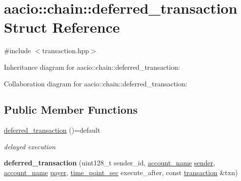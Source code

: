 \hypertarget{structaacio_1_1chain_1_1deferred__transaction}{}\section{aacio\+:\+:chain\+:\+:deferred\+\_\+transaction Struct Reference}
\label{structaacio_1_1chain_1_1deferred__transaction}


{\ttfamily \#include $<$transaction.\+hpp$>$}



Inheritance diagram for aacio\+:\+:chain\+:\+:deferred\+\_\+transaction\+:


Collaboration diagram for aacio\+:\+:chain\+:\+:deferred\+\_\+transaction\+:
\subsection*{Public Member Functions}
\begin{DoxyCompactItemize}
\item 
\mbox{\label{structaacio_1_1chain_1_1deferred__transaction_a7d0c49eab66f03e77d18849a0d96262d}} 
\mbox{\hyperlink{structaacio_1_1chain_1_1deferred__transaction_a7d0c49eab66f03e77d18849a0d96262d}{deferred\+\_\+transaction}} ()=default
\begin{DoxyCompactList}\small\item\em delayed execution \end{DoxyCompactList}\item 
\mbox{\label{structaacio_1_1chain_1_1deferred__transaction_a257fa1d5301fb8acad482281f24724da}} 
{\bfseries deferred\+\_\+transaction} (uint128\+\_\+t sender\+\_\+id, \mbox{\hyperlink{structaacio_1_1chain_1_1name}{account\+\_\+name}} \mbox{\hyperlink{structaacio_1_1chain_1_1deferred__transaction_a9f90d4dc7bf261b8450dd565f15fc82c}{sender}}, \mbox{\hyperlink{structaacio_1_1chain_1_1name}{account\+\_\+name}} \mbox{\hyperlink{structaacio_1_1chain_1_1deferred__transaction_a6c684aa768b05c5645bbef7e054cad8a}{payer}}, \mbox{\hyperlink{classfc_1_1time__point__sec}{time\+\_\+point\+\_\+sec}} execute\+\_\+after, const \mbox{\hyperlink{structaacio_1_1chain_1_1transaction}{transaction}} \&txn)
\end{DoxyCompactItemize}
